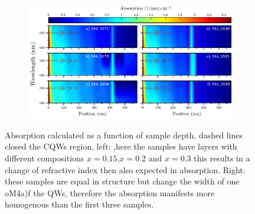 \begin{figure}[hbt!]
	\centering
	\begin{subfigure}{\textwidth}
		\includegraphics[width=\textwidth]{../figures/chapter-3/absorption-simulations/build/abs-calcs.pdf}
		\label{subfig:chapter-3-Absorption-M4_3171-a)}
		\label{subfig:chapter-3-Absorption-M4_3172-b)}
		\label{subfig:chapter-3-Absorption-M4_3226-c)}
		\label{subfig:chapter-3-Absorption-M4_3140-d)}
		\label{subfig:chapter-3-Absorption-M4_3521-e)}
		\label{subfig:chapter-3-Absorption-M4_3523-f)}
	\end{subfigure}
	\caption{Absorption calculated as a function of sample depth, dashed lines closed the CQWs region, left: ,here the samples have \algaas layers with different compositions $x=0.15$,$x=0.2$ and $x=0.3$ this results in a change of refractive index then also expected in absorption.  Right:  these samples are equal in structure but change the width of one oM4a)f the QWs, therefore the absorption manifests more homogenous than the first three samples. 
	}
	\label{fig:chapter-3-PL-Absorption-Calcs}
\end{figure}

